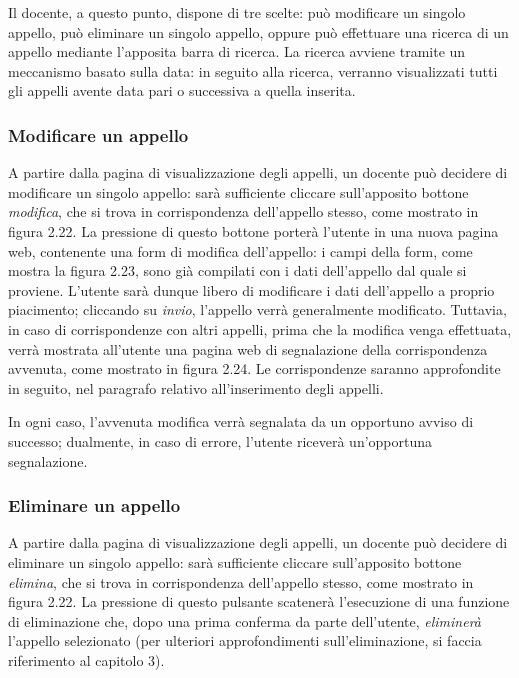 \documentclass [a4paper,11pt]{book}
\begin{document}

Il docente, a questo punto, dispone di tre scelte: può modificare un singolo appello, può eliminare un singolo appello, oppure può effettuare una ricerca di un appello mediante l'apposita barra di ricerca. La ricerca avviene tramite un meccanismo basato sulla data: in seguito alla ricerca, verranno visualizzati tutti gli appelli avente data pari o successiva a quella inserita.

\medskip

\subsubsection{Modificare un appello}

A partire dalla pagina di visualizzazione degli appelli, un docente può decidere di modificare un singolo appello: sarà sufficiente cliccare sull'apposito bottone \emph{modifica}, che si trova in corrispondenza dell'appello stesso, come mostrato in figura 2.22. La pressione di questo bottone porterà l'utente in una nuova pagina web, contenente una form di modifica dell'appello: i campi della form, come mostra la figura 2.23, sono già compilati con i dati dell'appello dal quale si proviene. L'utente sarà dunque libero di modificare i dati dell'appello a proprio piacimento; cliccando su \emph{invio}, l'appello verrà generalmente modificato. Tuttavia, in caso di corrispondenze con altri appelli, prima che la modifica venga effettuata, verrà mostrata all'utente una pagina web di segnalazione della corrispondenza avvenuta, come mostrato in figura 2.24. Le corrispondenze saranno approfondite in seguito, nel paragrafo relativo all'inserimento degli appelli.



In ogni caso, l'avvenuta modifica verrà segnalata da un opportuno avviso di successo; dualmente, in caso di errore, l'utente riceverà un'opportuna segnalazione.

\medskip

\subsubsection{Eliminare un appello}

A partire dalla pagina di visualizzazione degli appelli, un docente può decidere di eliminare un singolo appello: sarà sufficiente cliccare sull'apposito bottone \emph{elimina}, che si trova in corrispondenza dell'appello stesso, come mostrato in figura 2.22. La pressione di questo pulsante scatenerà l'esecuzione di una funzione di eliminazione che, dopo una prima conferma da parte dell'utente, \emph{eliminerà} l'appello selezionato (per ulteriori approfondimenti sull'eliminazione, si faccia riferimento al capitolo 3).
\end{document}
